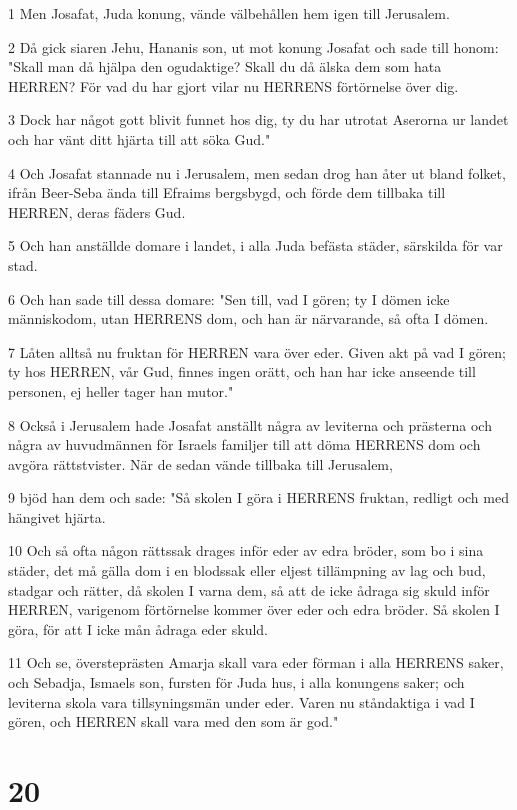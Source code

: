 \par 1 Men Josafat, Juda konung, vände välbehållen hem igen till Jerusalem.
\par 2 Då gick siaren Jehu, Hananis son, ut mot konung Josafat och sade till honom: "Skall man då hjälpa den ogudaktige? Skall du då älska dem som hata HERREN? För vad du har gjort vilar nu HERRENS förtörnelse över dig.
\par 3 Dock har något gott blivit funnet hos dig, ty du har utrotat Aserorna ur landet och har vänt ditt hjärta till att söka Gud."
\par 4 Och Josafat stannade nu i Jerusalem, men sedan drog han åter ut bland folket, ifrån Beer-Seba ända till Efraims bergsbygd, och förde dem tillbaka till HERREN, deras fäders Gud.
\par 5 Och han anställde domare i landet, i alla Juda befästa städer, särskilda för var stad.
\par 6 Och han sade till dessa domare: "Sen till, vad I gören; ty I dömen icke människodom, utan HERRENS dom, och han är närvarande, så ofta I dömen.
\par 7 Låten alltså nu fruktan för HERREN vara över eder. Given akt på vad I gören; ty hos HERREN, vår Gud, finnes ingen orätt, och han har icke anseende till personen, ej heller tager han mutor."
\par 8 Också i Jerusalem hade Josafat anställt några av leviterna och prästerna och några av huvudmännen för Israels familjer till att döma HERRENS dom och avgöra rättstvister. När de sedan vände tillbaka till Jerusalem,
\par 9 bjöd han dem och sade: "Så skolen I göra i HERRENS fruktan, redligt och med hängivet hjärta.
\par 10 Och så ofta någon rättssak drages inför eder av edra bröder, som bo i sina städer, det må gälla dom i en blodssak eller eljest tillämpning av lag och bud, stadgar och rätter, då skolen I varna dem, så att de icke ådraga sig skuld inför HERREN, varigenom förtörnelse kommer över eder och edra bröder. Så skolen I göra, för att I icke mån ådraga eder skuld.
\par 11 Och se, översteprästen Amarja skall vara eder förman i alla HERRENS saker, och Sebadja, Ismaels son, fursten för Juda hus, i alla konungens saker; och leviterna skola vara tillsyningsmän under eder. Varen nu ståndaktiga i vad I gören, och HERREN skall vara med den som är god."

\chapter{20}

